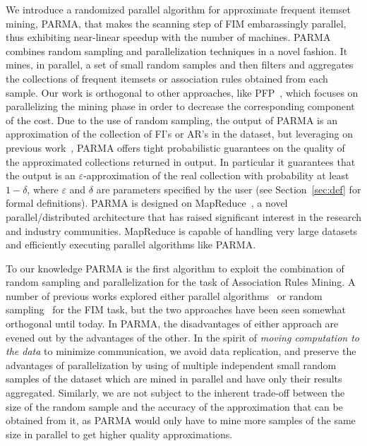 We introduce a randomized parallel algorithm for approximate frequent itemset
mining, PARMA, that makes the scanning step of FIM embarassingly parallel, thus
exhibiting near-linear speedup with the number of machines.  PARMA combines
random sampling and parallelization techniques in a novel fashion.  It mines, in
parallel, a set of small random samples and then filters and aggregates the
collections of frequent itemsets or association rules obtained from each sample.
Our work is orthogonal to other approaches, like PFP~\cite{LiWZZC08}, which
focuses on parallelizing the mining phase in order to decrease the corresponding
component of the cost. 
%
Due to the use of random sampling, the output of PARMA is an approximation of
the collection of FI's or AR's in the dataset, but leveraging on previous
work~\cite{RiondatoU11}, PARMA offers tight probabilistic guarantees on the
quality of the approximated collections returned in output. In particular it
guarantees that the output is an $\varepsilon$-approximation of the real
collection with probability at least $1-\delta$, where $\varepsilon$ and
$\delta$ are parameters specified by the user (see Section~\ref{sec:def} for
formal definitions). 
PARMA is designed on
MapReduce~\cite{DeanG08}, a novel parallel/distributed architecture that has
raised significant interest in the research and industry communities. MapReduce
is capable of handling very large datasets and efficiently executing parallel
algorithms like PARMA.

To our knowledge PARMA is the first algorithm to exploit the combination of
random sampling and parallelization for the task of Association Rules Mining.  A
number of previous works explored either parallel
algorithms~\cite{BuehrerPTKS07,CongHHP05,EHZaiane06,FangEtAl08,LiuLZT07,OzkuralUA11,JinYA05,Zaki99}
or random
sampling~\cite{Toivonen96,ZakiPLO97,Parthasarathy02,PietracaprinaRUV10,LiG04,RiondatoU11}
for the FIM task, but the two approaches have been seen somewhat orthogonal
until today. In PARMA, the disadvantages of either approach are evened out by
the advantages of the other. In the spirit of \emph{moving computation to the
data} to minimize communication, we avoid data replication, and preserve the
advantages of parallelization by using of multiple independent small random
samples of the dataset which are mined in parallel and have only their results
aggregated. Similarly, we are not subject to the inherent trade-off between
the size of the random sample and the accuracy of the approximation that can be
obtained from it, as PARMA would only have to mine more samples of the same size
in parallel to get higher quality approximations.

